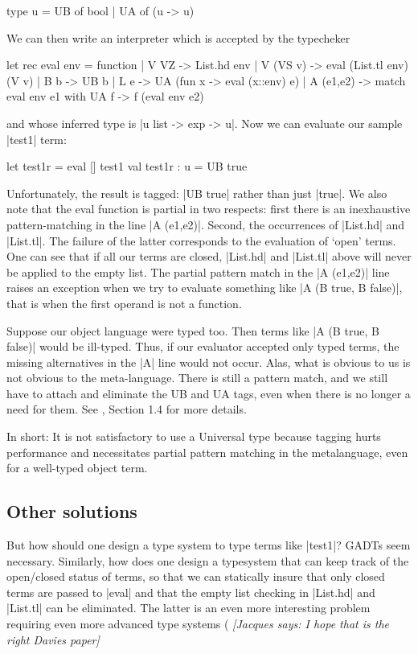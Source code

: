 \documentclass[preprint]{sigplanconf}
\newcommand{\jacques}[1]{{\it [Jacques says: #1]}}
\let\cite=\citep
\begin{document}
\begin{code}
  type u = UB of bool | UA of (u -> u)
\end{code}

We can then write an interpreter which is accepted by the typecheker
\begin{code}
let rec eval env = function
  | V VZ -> List.hd env
  | V (VS v) -> eval (List.tl env) (V v)
  | B b -> UB b
  | L e -> UA (fun x -> eval (x::env) e)
  | A (e1,e2) -> match eval env e1 with UA f -> f (eval env e2)
\end{code}
and whose inferred type is |u list -> exp -> u|. Now we can evaluate
our sample |test1| term:

\begin{code}
let test1r = eval [] test1
val test1r : u = UB true 
\end{code}

Unfortunately, the result is tagged: |UB true| rather than just
|true|. We also note that the eval function is partial in two
respects: first there is an inexhaustive pattern-matching in the 
line |A (e1,e2)|.
Second, the occurrences of |List.hd| and |List.tl|.
The failure of the latter corresponds to the evaluation of `open'
terms. One can see that if all our terms are closed, |List.hd| and
|List.tl| above will never be applied to the empty list. The partial
pattern match in the |A (e1,e2)| line raises an exception when we try to
evaluate something like |A (B true, B false)|, that is when the first
operand is not a function. 

Suppose our object language were typed too. Then terms like
|A (B true, B false)| would be ill-typed. Thus, if our evaluator
accepted only typed terms, the missing alternatives in the |A|
line would not occur. Alas, what is obvious to us is not obvious to
the meta-language. There is still a pattern match, and we still have
to attach and eliminate the UB and UA tags, even when there is no
longer a need for them. See \cite{WalidICFP02}, Section 1.4 for more details.

In short: It is not satisfactory
to use a Universal type because tagging hurts performance and
necessitates partial pattern matching in the metalanguage, even for a
well-typed object term.  

\subsection{Other solutions}

But how should one design a type system to type
terms like |test1|? GADTs seem necessary. Similarly, how does one design a
typesystem that can keep track of the open/closed status of terms, so that we
can statically insure that only closed terms are passed to |eval| and that
the empty list checking in |List.hd| and |List.tl| can be eliminated.
The latter is an even more interesting problem requiring even
more advanced type systems 
(\cite{WalidPOPLo3,NanevskiICFP02,NanevskiJFP05,DaviesJACM01}
\jacques{I hope that is the right Davies paper}
\end{document}
